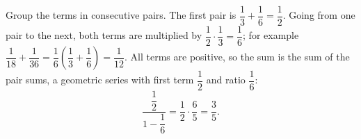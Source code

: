 Group the terms in consecutive pairs. The first pair is $\dfrac13+\dfrac16=\dfrac12$. Going from one pair to the next, both terms are multiplied by $\dfrac12\cdot\dfrac13=\dfrac16$; for example $\dfrac1{18}+\dfrac1{36}=\dfrac16\left(\dfrac13+\dfrac16\right)=\dfrac1{12}$. All terms are positive, so the sum is the sum of the pair sums, a geometric series with first term $\dfrac12$ and ratio $\dfrac16$:
\[\dfrac{\dfrac12}{1-\dfrac16}=\dfrac12\cdot\dfrac65=\boxed{\dfrac35}.\]

